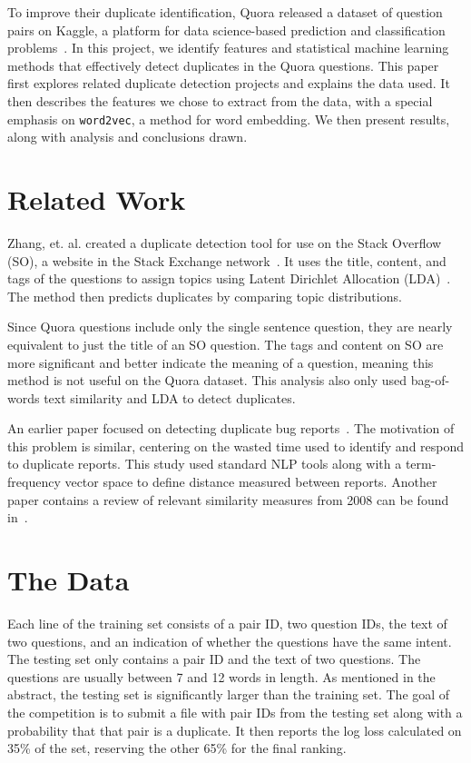 \documentclass{article} %
\newcommand{\wordtvec}{\texttt{word2vec}}
\begin{document}
To improve their duplicate identification, Quora released a dataset of question pairs on Kaggle, a platform for data science-based prediction and classification problems~\cite{kaggleComp}. In this project, we identify features and statistical machine learning methods that effectively detect duplicates in the Quora questions. This paper first explores related duplicate detection projects and explains the data used. It then describes the features we chose to extract from the data, with a special emphasis on \wordtvec, a method for word embedding. We then present results, along with analysis and conclusions drawn. 



\section{Related Work}

Zhang, et. al. created a duplicate detection tool for use on the Stack Overflow (SO), a website in the Stack Exchange network~\cite{Zhang2015}. It uses the title, content, and tags of the questions to assign topics using Latent Dirichlet Allocation (LDA)~\cite{Blei03}. The method then predicts duplicates by comparing topic distributions.

Since Quora questions include only the single sentence question, they are nearly equivalent to just the title of an SO question. The tags and content on SO are more significant and better indicate the meaning of a question, meaning this method is not useful on the Quora dataset. This analysis also only used bag-of-words text similarity and LDA to detect duplicates.

An earlier paper focused on detecting duplicate bug reports~\cite{Runeson2007}. The motivation of this problem is similar, centering on the wasted time used to identify and respond to duplicate reports. This study used standard NLP tools along with a term-frequency vector space to define distance measured between reports. Another paper contains a review of relevant similarity measures from 2008 can be found in~\cite{acha08}.



\section{The Data}

Each line of the training set consists of a pair ID, two question IDs, the text of two questions, and an indication of whether the questions have the same intent. The testing set only contains a pair ID and the text of two questions. The questions are usually between 7 and 12 words in length. As mentioned in the abstract, the testing set is significantly larger than the training set. The goal of the competition is to submit a file with pair IDs from the testing set along with a probability that that pair is a duplicate. It then reports the log loss calculated on 35\% of the set, reserving the other 65\% for the final ranking.
\end{document}
